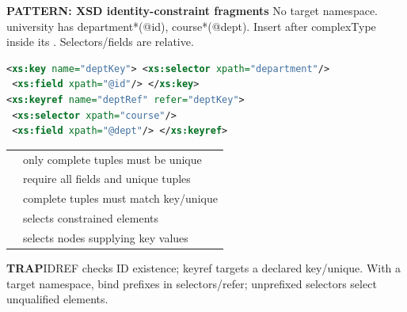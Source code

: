 \documentclass[a4paper]{article}
\newcommand{\sqlfont}{\ttfamily}
\newcommand{\bodyfontsize}{5.55}
\newcommand{\bodyleading}{5.3}
\newcommand{\bodylineskiplimit}{-2pt}
\newcommand{\bodystyle}{%
  \fontsize{\bodyfontsize}{\bodyleading}\selectfont\setlength{\lineskiplimit}{\bodylineskiplimit}\RaggedRight
  \setlength{\abovedisplayskip}{.5pt}\setlength{\belowdisplayskip}{.5pt}%
  \setlength{\abovedisplayshortskip}{.3pt}\setlength{\belowdisplayshortskip}{.3pt}}
\newenvironment{topicblock}
  {\par\bodystyle}
  {\par}
\newcommand{\key}[1]{\par\textcolor{structure}{\textbf{#1}}\enspace}
\newcommand{\note}[4]{\par\nointerlineskip\vspace{.25pt}\begingroup\setlength{\fboxsep}{0.1pt}%
  \noindent\colorbox{#1}{\parbox{\dimexpr\linewidth-2\fboxsep\relax}{%
    \RaggedRight\textcolor{#2}{\textbf{#3}}\enspace #4}}%
  \endgroup\par\nointerlineskip\vspace{.25pt}}
\newcommand{\trap}[1]{\note{warningbg}{warning}{TRAP}{#1}}
\newcommand{\pattern}[1]{\key{PATTERN: #1}}
\newcommand{\sql}[1]{{\sqlfont\color{sqltext}\detokenize{#1}}}
\newlength{\sheetwidth}
\newenvironment{sheetcolumns}[1]
  {\noindent\begin{minipage}[t]{#1\sheetwidth}\vspace{0pt}\bodystyle\ignorespaces}
  {\end{minipage}\par}
\begin{document}
\begin{sheetcolumns}{.267}
\begin{topicblock}
\pattern{XSD identity-constraint fragments}
No target namespace. university has department*(@id), course*(@dept). Insert after complexType inside its \sql{xs:element}. Selectors/fields are relative.
\begin{lstlisting}[style=Plaincode,language=XML]
<xs:key name="deptKey"> <xs:selector xpath="department"/>
 <xs:field xpath="@id"/> </xs:key>
<xs:keyref name="deptRef" refer="deptKey">
 <xs:selector xpath="course"/>
 <xs:field xpath="@dept"/> </xs:keyref>
\end{lstlisting}
\par\begin{tabular}{@{}ll@{}}
\sql{xs:unique} & only complete tuples must be unique\\
\sql{xs:key} & require all fields and unique tuples\\
\sql{xs:keyref} & complete tuples must match key/unique\\
\sql{xs:selector} & selects constrained elements\\
\sql{xs:field} & selects nodes supplying key values
\end{tabular}\par
\trap{IDREF checks ID existence; keyref targets a declared key/unique. With a target namespace, bind prefixes in selectors/refer; unprefixed selectors select unqualified elements.}
\end{topicblock}


\end{sheetcolumns}
\end{document}
